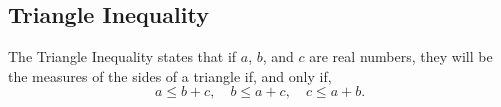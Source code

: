 \subsection{Triangle Inequality}

The Triangle Inequality states that if \(a\), \(b\), and \(c\) are real numbers, they will be the measures of the sides of a triangle if, and only if,
\[
a \leq b + c, \quad b \leq a + c, \quad c \leq a + b.
\]
